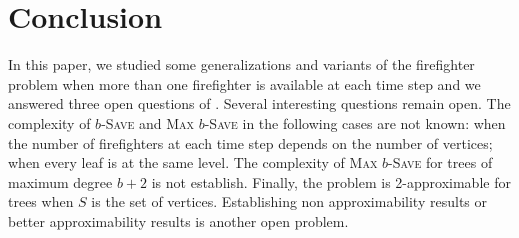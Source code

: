 \documentclass[10pt]{article}
\newcommand{\probtitle}[1]{\textsc{#1}}
\begin{document}
\section{Conclusion}\label{s:concl}

In this paper, we studied some generalizations and variants of the firefighter problem when more than one firefighter is available at each time step and we answered three open questions of \cite{finbow2009}.
Several interesting questions remain open. The complexity of \probtitle{$b$-Save} and \probtitle{Max $b$-Save} in the following cases are not known: when the number of firefighters at each time step depends on the number of vertices; when every leaf is at the same level. The complexity of \probtitle{Max $b$-Save} for trees of maximum degree $b+2$ is not establish.
Finally, the problem is 2-approximable for trees when $S$ is the set of vertices. Establishing non approximability results or better approximability results is another open problem.
  







\end{document}
